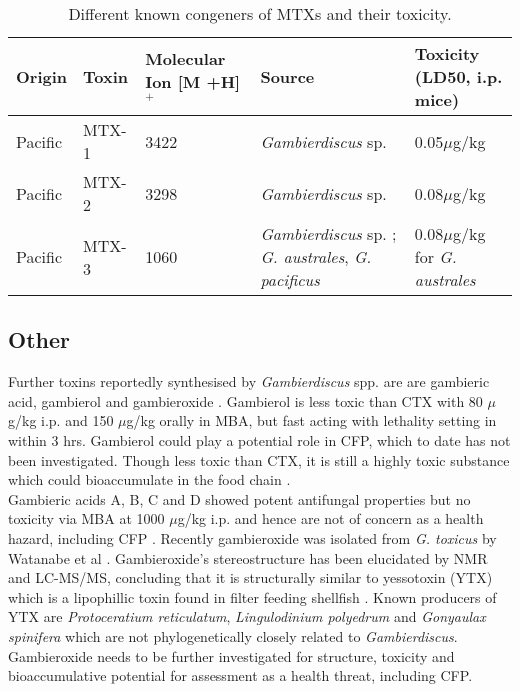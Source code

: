 \documentclass[12pt]{article}
\begin{document}
\begin{table}
\caption{Different known congeners of MTXs and their toxicity.}
\label{tbl:MTXTable}
\begin{tabular}{ |  p{2cm} | p{2cm} | p{3cm} | p{3cm} | p{4cm} | }
\hline
\textbf{Origin} & \textbf{Toxin} & \textbf{Molecular Ion [M +H]$^{+}$} & \textbf{Source} & \textbf{Toxicity (LD50, i.p. mice)} \\
\hline
 Pacific & MTX-1 & 3422 \cite{holmes1994purification,murata1993structure} & \emph{Gambierdiscus} sp. \cite{holmes1994purification} & 0.05$\mu$g/kg \cite{murata1993structure}\\
 \hline
 Pacific & MTX-2 & 3298 \cite{holmes1994purification} & \emph{Gambierdiscus} sp. \cite{holmes1994purification} & 0.08$\mu$g/kg \cite{holmes1994purification}\\
 \hline
 Pacific & MTX-3 & 1060   \cite{holmes1994purification} & \emph{Gambierdiscus} sp. \cite{holmes1994purification}; \emph{G. australes}, \emph{G. pacificus} \cite{rhodes2014production} &  0.08$\mu$g/kg for \emph{G. australes}  \cite{rhodes2014production} \\
 \hline
\end{tabular}
\end{table}
\FloatBarrier
\subsection{Other}
Further toxins reportedly synthesised by \emph{Gambierdiscus} spp. are are gambieric acid, gambierol and gambieroxide \cite{watanabe2013gambieroxide,satake1993gambierol,nagai1992gambieric}.
Gambierol is less toxic than CTX with 80 $\mu$g/kg i.p. and 150 $\mu$g/kg orally in MBA, but fast acting with lethality setting in within 3 hrs\cite{ito2003pathological}. Gambierol could play a potential role in CFP, which to date has not been investigated. Though less toxic than CTX, it is still a highly toxic substance which could bioaccumulate in the food chain \cite{rhodes2014production}.\\
Gambieric acids A, B, C and D showed potent antifungal properties but no toxicity via MBA at 1000 $\mu$g/kg i.p. and hence are not of concern as a health hazard, including CFP \cite{rhodes2014production,nagai1992gambieric}.
Recently gambieroxide was isolated from \emph{G. toxicus} by Watanabe et al \cite{watanabe2013gambieroxide}. Gambieroxide's stereostructure has been elucidated by NMR and LC-MS/MS, concluding that it is structurally similar to yessotoxin (YTX) which is a lipophillic toxin found in filter feeding shellfish  \cite{tubaro2010yessotoxins}. Known producers of YTX are \emph{Protoceratium reticulatum}, \emph{Lingulodinium polyedrum} and \emph{Gonyaulax spinifera} \cite{tubaro2010yessotoxins} which are not  phylogenetically closely related to \emph{Gambierdiscus}.  Gambieroxide needs to be further investigated for structure, toxicity and bioaccumulative potential for assessment as a health threat, including CFP. \\
\end{document}
